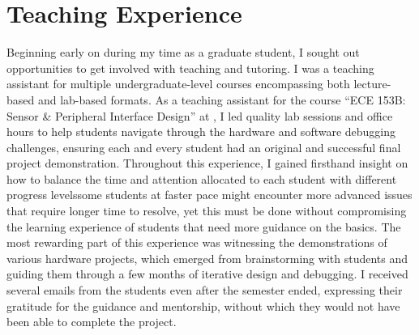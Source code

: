 \section*{Teaching Experience}
Beginning early on during my time as a graduate student, I sought out opportunities to get involved with teaching and tutoring. I was a teaching assistant for multiple undergraduate-level courses encompassing both lecture-based and lab-based formats. As a teaching assistant for the course ``ECE 153B: Sensor \& Peripheral Interface Design'' at \myPhDSchoolShort{}, I led quality lab sessions and office hours to help students navigate through the hardware and software debugging challenges, ensuring each and every student had an original and successful final project demonstration. Throughout this experience, I gained firsthand insight on how to balance the time and attention allocated to each student with different progress levels\textemdash{}some students at faster pace might encounter more advanced issues that require longer time to resolve, yet this must be done without compromising the learning experience of students that need more guidance on the basics. The most rewarding part of this experience was witnessing the demonstrations of various hardware projects, which emerged from brainstorming with students and guiding them through a few months of iterative design and debugging. I received several emails from the students even after the semester ended, expressing their gratitude for the guidance and mentorship, without which they would not have been able to complete the project.


